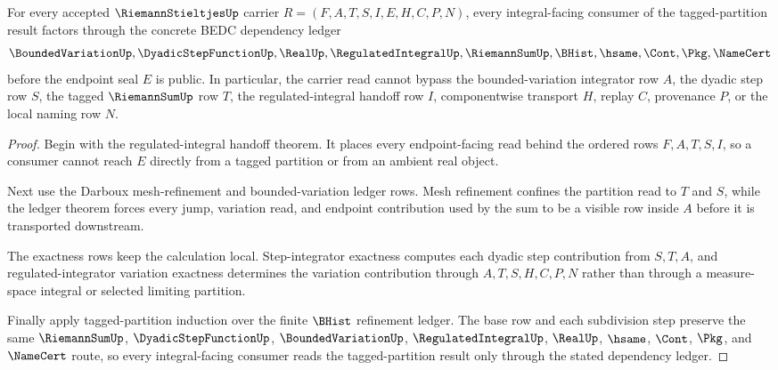 \begin{theorem}
\label{thm:riemann-stieltjes-scope-ledger}
For every accepted $\RiemannStieltjesUp$ carrier $R=(F,A,T,S,I,E,H,C,P,N)$, every integral-facing consumer of the tagged-partition result factors through the concrete BEDC dependency ledger
$$
\BoundedVariationUp,\DyadicStepFunctionUp,\RealUp,\RegulatedIntegralUp,\RiemannSumUp,\BHist,\hsame,\Cont,\Pkg,\NameCert
$$
before the endpoint seal $E$ is public. In particular, the carrier read cannot bypass the bounded-variation integrator row $A$, the dyadic step row $S$, the tagged $\RiemannSumUp$ row $T$, the regulated-integral handoff row $I$, componentwise transport $H$, replay $C$, provenance $P$, or the local naming row $N$.
\end{theorem}
\begin{proof}
Begin with the regulated-integral handoff theorem. It places every endpoint-facing read behind the ordered rows $F,A,T,S,I$, so a consumer cannot reach $E$ directly from a tagged partition or from an ambient real object.

Next use the Darboux mesh-refinement and bounded-variation ledger rows. Mesh refinement confines the partition read to $T$ and $S$, while the ledger theorem forces every jump, variation read, and endpoint contribution used by the sum to be a visible row inside $A$ before it is transported downstream.

The exactness rows keep the calculation local. Step-integrator exactness computes each dyadic step contribution from $S,T,A$, and regulated-integrator variation exactness determines the variation contribution through $A,T,S,H,C,P,N$ rather than through a measure-space integral or selected limiting partition.

Finally apply tagged-partition induction over the finite $\BHist$ refinement ledger. The base row and each subdivision step preserve the same $\RiemannSumUp$, $\DyadicStepFunctionUp$, $\BoundedVariationUp$, $\RegulatedIntegralUp$, $\RealUp$, $\hsame$, $\Cont$, $\Pkg$, and $\NameCert$ route, so every integral-facing consumer reads the tagged-partition result only through the stated dependency ledger.
\end{proof}


